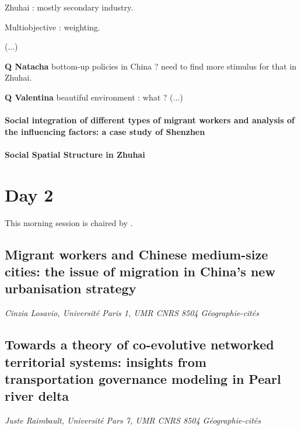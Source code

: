 Zhuhai : mostly secondary industry.

Multiobjective : weighting.

(...)

\textbf{Q Natacha} bottom-up policies in China ? need to find more stimulus for that in Zhuhai.

\textbf{Q Valentina} beautiful environment : what ? (...)







\paragraph{Social integration of different types of migrant workers and analysis of the influencing factors: a case study of Shenzhen}






\paragraph{Social Spatial Structure in Zhuhai}






\section*{Day 2}

This morning session is chaired by .


\subsection*{Migrant workers and Chinese medium-size cities: the issue of migration in China’s new urbanisation strategy}

\textit{Cinzia Losavio, Université Paris 1, UMR CNRS 8504 Géographie-cités}




\subsection*{Towards a theory of co-evolutive networked territorial systems: insights from transportation governance modeling in Pearl river delta}

\textit{Juste Raimbault, Université Pars 7, UMR CNRS 8504 Géographie-cités}





